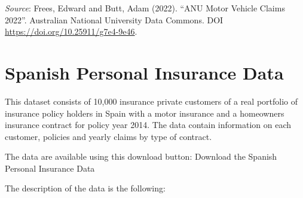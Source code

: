 \documentclass[
]{book}
\begin{document}
\emph{Source}: Frees, Edward and Butt, Adam (2022). ``ANU Motor Vehicle Claims 2022''. Australian National University Data Commons. DOI \url{https://doi.org/10.25911/g7e4-9e46}.

\hypertarget{spanish-personal-insurance-data}{%
\section{Spanish Personal Insurance Data}\label{spanish-personal-insurance-data}}

This dataset consists of 10,000 insurance private customers of a real portfolio of insurance policy holders in Spain with a motor insurance and a homeowners insurance contract for policy year 2014. The data contain information on each customer, policies and yearly claims by type of contract.

The data are available using this download button:
Download the Spanish Personal Insurance Data

The description of the data is the following:
\end{document}
